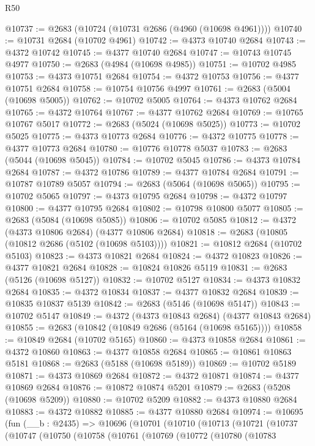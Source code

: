 \begin{lexlean}{R50}
\begin{coremodule}
@10737 := @2683 (@10724 (@10731 @2686 (@4960 (@10698 @4961))))
@10740 := @10731 @2684 (@10702 @4961)
@10742 := @4373 @10740 @2684
@10743 := @4372 @10742
@10745 := @4377 @10740 @2684
@10747 := @10743 @10745 @4977
@10750 := @2683 (@4984 (@10698 @4985))
@10751 := @10702 @4985
@10753 := @4373 @10751 @2684
@10754 := @4372 @10753
@10756 := @4377 @10751 @2684
@10758 := @10754 @10756 @4997
@10761 := @2683 (@5004 (@10698 @5005))
@10762 := @10702 @5005
@10764 := @4373 @10762 @2684
@10765 := @4372 @10764
@10767 := @4377 @10762 @2684
@10769 := @10765 @10767 @5017
@10772 := @2683 (@5024 (@10698 @5025))
@10773 := @10702 @5025
@10775 := @4373 @10773 @2684
@10776 := @4372 @10775
@10778 := @4377 @10773 @2684
@10780 := @10776 @10778 @5037
@10783 := @2683 (@5044 (@10698 @5045))
@10784 := @10702 @5045
@10786 := @4373 @10784 @2684
@10787 := @4372 @10786
@10789 := @4377 @10784 @2684
@10791 := @10787 @10789 @5057
@10794 := @2683 (@5064 (@10698 @5065))
@10795 := @10702 @5065
@10797 := @4373 @10795 @2684
@10798 := @4372 @10797
@10800 := @4377 @10795 @2684
@10802 := @10798 @10800 @5077
@10805 := @2683 (@5084 (@10698 @5085))
@10806 := @10702 @5085
@10812 := @4372 (@4373 @10806 @2684) (@4377 @10806 @2684)
@10818 := @2683 (@10805 (@10812 @2686 (@5102 (@10698 @5103))))
@10821 := @10812 @2684 (@10702 @5103)
@10823 := @4373 @10821 @2684
@10824 := @4372 @10823
@10826 := @4377 @10821 @2684
@10828 := @10824 @10826 @5119
@10831 := @2683 (@5126 (@10698 @5127))
@10832 := @10702 @5127
@10834 := @4373 @10832 @2684
@10835 := @4372 @10834
@10837 := @4377 @10832 @2684
@10839 := @10835 @10837 @5139
@10842 := @2683 (@5146 (@10698 @5147))
@10843 := @10702 @5147
@10849 := @4372 (@4373 @10843 @2684) (@4377 @10843 @2684)
@10855 := @2683 (@10842 (@10849 @2686 (@5164 (@10698 @5165))))
@10858 := @10849 @2684 (@10702 @5165)
@10860 := @4373 @10858 @2684
@10861 := @4372 @10860
@10863 := @4377 @10858 @2684
@10865 := @10861 @10863 @5181
@10868 := @2683 (@5188 (@10698 @5189))
@10869 := @10702 @5189
@10871 := @4373 @10869 @2684
@10872 := @4372 @10871
@10874 := @4377 @10869 @2684
@10876 := @10872 @10874 @5201
@10879 := @2683 (@5208 (@10698 @5209))
@10880 := @10702 @5209
@10882 := @4373 @10880 @2684
@10883 := @4372 @10882
@10885 := @4377 @10880 @2684
@10974 := @10695
    (fun (__b : @2435) =>
    @10696
      (@10701
        (@10710
          (@10713
            (@10721
              (@10737
                (@10747
                  (@10750
                    (@10758
                      (@10761
                        (@10769
                          (@10772
                            (@10780
                              (@10783

\end{coremodule}
\end{lexlean}
